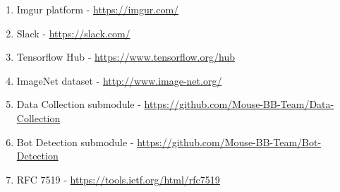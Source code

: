 \begin{enumerate}
    \item Imgur platform - \url{https://imgur.com/}\label{itm:imgur}
    \item Slack - \url{https://slack.com/}\label{itm:slack}
    \item Tensorflow Hub - \url{https://www.tensorflow.org/hub}\label{itm:tensorflow-hub}
    \item ImageNet dataset - \url{http://www.image-net.org/}\label{itm:image-net}
    \item Data Collection submodule - \url{https://github.com/Mouse-BB-Team/Data-Collection}\label{itm:data-collection}
    \item Bot Detection submodule - \url{https://github.com/Mouse-BB-Team/Bot-Detection}\label{itm:bot-detection}
    \item RFC 7519 - \url{https://tools.ietf.org/html/rfc7519}\label{itm:rfc-jwt}
\end{enumerate}
